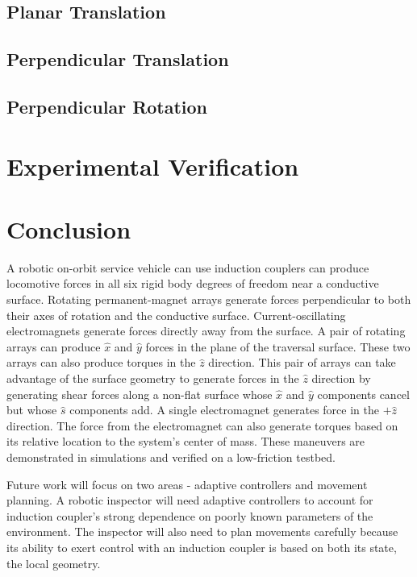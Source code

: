 \documentclass[10pt]{article}
\begin{document}
\subsection{Planar Translation}
\subsection{Perpendicular Translation}
\subsection{Perpendicular Rotation}
\section{Experimental Verification}
\section{Conclusion}
A robotic on-orbit service vehicle can use induction couplers can produce locomotive forces in all six rigid body degrees of freedom near a conductive surface. Rotating permanent-magnet arrays generate forces perpendicular to both their axes of rotation and the conductive surface. Current-oscillating electromagnets generate forces directly away from the surface. A pair of rotating arrays can produce $\hat{x}$ and $\hat{y}$ forces in the plane of the traversal surface. These two arrays can also produce torques in the $\hat{z}$ direction. This pair of arrays can take advantage of the surface geometry to generate forces in the $\hat{z}$ direction by generating shear forces along a non-flat surface whose $\hat{x}$ and $\hat{y}$ components cancel but whose $\hat{s}$ components add. A single electromagnet generates force in the $+\hat{z}$ direction. The force from the electromagnet can also generate torques based on its relative location to the system's center of mass. These maneuvers are demonstrated in simulations and verified on a low-friction testbed.  

Future work will focus on two areas - adaptive controllers and movement planning. A robotic inspector will need adaptive controllers to account for induction coupler's strong dependence on poorly known parameters of the environment.  The inspector will also need to plan movements carefully because its ability to exert control with an induction coupler is based on both its state, the local geometry.      
\end{document}
